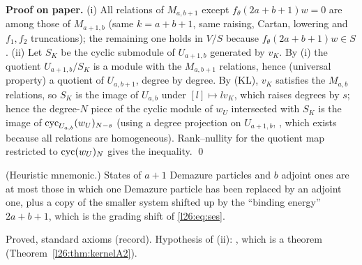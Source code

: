 \textbf{Proof on paper.} (i) All relations of $M_{a,b+1}$ except $f_\theta(2a+b+1)w=0$ are among those of $M_{a+1,b}$
(same $k=a+b+1$, same raising, Cartan, lowering and $f_1,f_2$ truncations); the remaining one holds in $V/S$ because
$f_\theta(2a+b+1)w\in S$. (ii) Let $S_K$ be the cyclic submodule of $U_{a+1,b}$ generated by $v_K$. By (i) the quotient
$U_{a+1,b}/S_K$ is a module with the $M_{a,b+1}$ relations, hence (universal property) a quotient of $U_{a,b+1}$, degree
by degree. By (KL), $v_K$ satisfies the $M_{a,b}$ relations, so $S_K$ is the image of $U_{a,b}$ under $[l]\mapsto lv_K$,
which raises degrees by $s$; hence the degree-$N$ piece of the cyclic module of $w_U$ intersected with $S_K$ is the image of
$\operatorname{cyc}_{U_{a,b}}(w_U)_{N-s}$ (using a degree projection on $U_{a+1,b}$, , which exists because all
relations are homogeneous). Rank--nullity for the quotient map restricted to $\operatorname{cyc}(w_U)_N$ gives the inequality. \qed

\begin{physics}
(Heuristic mnemonic.) States of $a+1$ Demazure particles and $b$ adjoint ones are at most those in which one Demazure particle has
been replaced by an adjoint one, plus a copy of the smaller system shifted up by the ``binding energy'' $2a+b+1$, which is the
grading shift of \eqref{l26:eq:ses}.
\end{physics}

\begin{status}
Proved, standard axioms (record). Hypothesis of (ii): , which is a theorem
(Theorem~\ref{l26:thm:kernelA2}).
\end{status}

